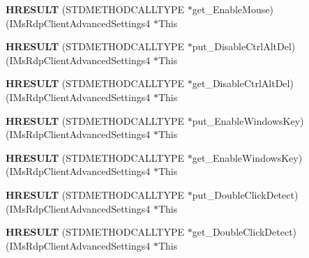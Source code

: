 \begin{DoxyCompactItemize}
{\bfseries H\+R\+E\+S\+U\+LT} (S\+T\+D\+M\+E\+T\+H\+O\+D\+C\+A\+L\+L\+T\+Y\+PE $\ast$get\+\_\+\+Enable\+Mouse)(I\+Ms\+Rdp\+Client\+Advanced\+Settings4 $\ast$This
\item 
\mbox{\label{struct_i_ms_rdp_client_advanced_settings4_vtbl_a44094f00ae7624aa49920ff206dfb2fc}} 
{\bfseries H\+R\+E\+S\+U\+LT} (S\+T\+D\+M\+E\+T\+H\+O\+D\+C\+A\+L\+L\+T\+Y\+PE $\ast$put\+\_\+\+Disable\+Ctrl\+Alt\+Del)(I\+Ms\+Rdp\+Client\+Advanced\+Settings4 $\ast$This
\item 
\mbox{\label{struct_i_ms_rdp_client_advanced_settings4_vtbl_af8ef56e8b9ce6569364457fee005ec81}} 
{\bfseries H\+R\+E\+S\+U\+LT} (S\+T\+D\+M\+E\+T\+H\+O\+D\+C\+A\+L\+L\+T\+Y\+PE $\ast$get\+\_\+\+Disable\+Ctrl\+Alt\+Del)(I\+Ms\+Rdp\+Client\+Advanced\+Settings4 $\ast$This
\item 
\mbox{\label{struct_i_ms_rdp_client_advanced_settings4_vtbl_a095ab0be486223be6491a80d3983c56d}} 
{\bfseries H\+R\+E\+S\+U\+LT} (S\+T\+D\+M\+E\+T\+H\+O\+D\+C\+A\+L\+L\+T\+Y\+PE $\ast$put\+\_\+\+Enable\+Windows\+Key)(I\+Ms\+Rdp\+Client\+Advanced\+Settings4 $\ast$This
\item 
\mbox{\label{struct_i_ms_rdp_client_advanced_settings4_vtbl_a97183bc153cce30062012d3465c2a2e3}} 
{\bfseries H\+R\+E\+S\+U\+LT} (S\+T\+D\+M\+E\+T\+H\+O\+D\+C\+A\+L\+L\+T\+Y\+PE $\ast$get\+\_\+\+Enable\+Windows\+Key)(I\+Ms\+Rdp\+Client\+Advanced\+Settings4 $\ast$This
\item 
\mbox{\label{struct_i_ms_rdp_client_advanced_settings4_vtbl_a01949ac1757997f65d9097f3c7cb6f90}} 
{\bfseries H\+R\+E\+S\+U\+LT} (S\+T\+D\+M\+E\+T\+H\+O\+D\+C\+A\+L\+L\+T\+Y\+PE $\ast$put\+\_\+\+Double\+Click\+Detect)(I\+Ms\+Rdp\+Client\+Advanced\+Settings4 $\ast$This
\item 
\mbox{\label{struct_i_ms_rdp_client_advanced_settings4_vtbl_a9bbc7be2d8bbcb89e35034ef6fe9a344}} 
{\bfseries H\+R\+E\+S\+U\+LT} (S\+T\+D\+M\+E\+T\+H\+O\+D\+C\+A\+L\+L\+T\+Y\+PE $\ast$get\+\_\+\+Double\+Click\+Detect)(I\+Ms\+Rdp\+Client\+Advanced\+Settings4 $\ast$This

\end{DoxyCompactItemize}

